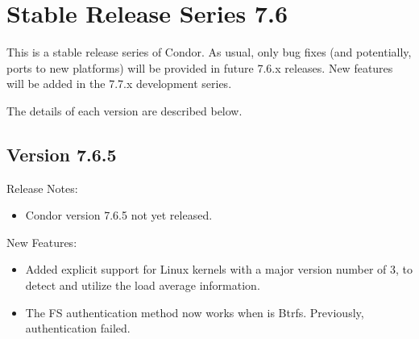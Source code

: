 
\section{\label{sec:History-7-6}Stable Release Series 7.6}

This is a stable release series of Condor.
As usual, only bug fixes (and potentially, ports to new platforms)
will be provided in future 7.6.x releases.
New features will be added in the 7.7.x development series.

The details of each version are described below.

\subsection*{\label{sec:New-7-6-5}Version 7.6.5}

\noindent Release Notes:

\begin{itemize}

\item Condor version 7.6.5 not yet released.

\end{itemize}


\noindent New Features:

\begin{itemize}

\item Added explicit support for Linux kernels with a major version number of 3,
to detect and utilize the load average information.

\item The FS authentication method now works when  is
Btrfs.  Previously, authentication failed.

\end{itemize}

